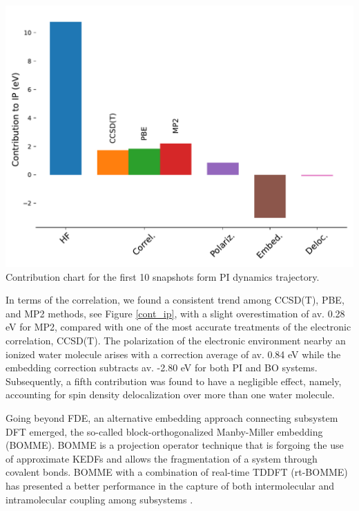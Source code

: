 \documentclass[notitlepage,12pt]{report}
\begin{document}
\begin{minipage}{0.4\textwidth}
	\label{cont_ip}
	\includegraphics[width=\linewidth]{./images/contribution_liquidwater_PI}
	{Contribution chart for the first 10 snapshots form PI dynamics trajectory. \supercite{gaiduk2018electron}}
\end{minipage}
\begin{minipage}{0.55\textwidth}
	In terms of the correlation, we found a consistent trend among CCSD(T), PBE, and MP2 methods, see Figure \ref{cont_ip}, with a slight overestimation of av. 0.28 eV for MP2, compared with one of the most accurate treatments of the electronic correlation, CCSD(T). The polarization of the electronic environment nearby an ionized water molecule arises with a correction average of av. 0.84 eV while the embedding correction subtracts av. -2.80 eV for both PI and BO systems. Subsequently, a fifth contribution was found to have a negligible effect, namely, accounting for spin density delocalization over more than one water molecule. 
\end{minipage}
	
	Going beyond FDE, an alternative embedding approach connecting subsystem DFT emerged, the so-called block-orthogonalized Manby-Miller embedding (BOMME). BOMME is a projection operator technique that is forgoing the use of approximate KEDFs and allows the fragmentation of a system through covalent bonds\supercite{ding2017embedded}. BOMME with a combination of real-time TDDFT (rt-BOMME) has presented a better performance in the capture of both intermolecular and intramolecular coupling among subsystems \supercite{koh2017accelerating}.
	
\end{document}
